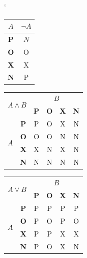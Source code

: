 \documentclass[a4paper, 11pt, times]{article}
\begin{document}
\begin{table}[h]
\begin{center}
\catcode`
  

  \begin{tabular}{|c|c|}
    \hline
    $A$           &     $ \neg A $ \\ \hline
    \textbf{P}    &     $ N $      \\ \hline
    \textbf{O}    &     O          \\ \hline
    \textbf{X}    &     X          \\ \hline
    \textbf{N}    &     P          \\ \hline
  \end{tabular}


  \begin{tabular}{ |c|c|c|c|c|c| }
    \hline
    \multicolumn{2}{|c}{\multirow{2}{*}{$A \land B$ }} & \multicolumn{4}{|c|}{$B$} \\ \cline{3-6}
    \multicolumn{2}{|c|}{} &  \textbf{P}  & \textbf{O}  & \textbf{X}  & \textbf{N} \\ \hline
    \multirow{4}{*}{$A$} & \textbf{P} & P & O & X & N \\ \cline{2-6}
    &                      \textbf{O} & O & O & N & N \\ \cline{2-6}
    &                      \textbf{X} & X & N & X & N \\ \cline{2-6}
    &                      \textbf{N} & N & N & N & N \\ \hline
  \end{tabular}


  \begin{tabular}{ |c|c|c|c|c|c| }
  \hline
  \multicolumn{2}{|c}{\multirow{2}{*}{$A \lor B$ }} & \multicolumn{4}{|c|}{$B$} \\ \cline{3-6}
    \multicolumn{2}{|c|}{} &   \textbf{P}  & \textbf{O}  & \textbf{X}  & \textbf{N} \\ \hline
    \multirow{4}{*}{$A$} & \textbf{P} & P & P & P & P \\ \cline{2-6}
    &                      \textbf{O} & P & O & P & O \\ \cline{2-6}
    &                      \textbf{X} & P & P & X & X \\ \cline{2-6}
    &                      \textbf{N} & P & O & X & N \\ \hline
  \end{tabular}



\end{center}
\end{table}
\end{document}
